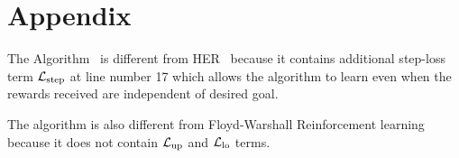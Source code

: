 \section{Appendix}

The Algorithm~\cite{alg:floyd-warshall-deep} is different from
HER~\cite{andrychowicz2016learning} because it contains additional step-loss
term $\mathcal{L}_{\text{step}}$ at line number 17 which allows the algorithm to learn even when
the rewards received are independent of desired goal.

The algorithm is also different from Floyd-Warshall Reinforcement learning
because it does not contain $\mathcal{L}_{\text{up}}$ and $\mathcal{L}_{\text{lo}}$ terms. 


